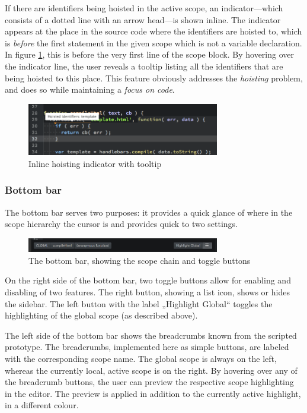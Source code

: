 If there are identifiers being hoisted in the active scope, an
indicator—which consists of a dotted line with an arrow head—is shown
inline. The indicator appears at the place in the source code where the
identifiers are hoisted to, which is \emph{before} the first statement
in the given scope which is not a variable declaration. In figure
\ref{fig:protohoisting}, this is before the very first line of the scope
block. By hovering over the indicator line, the user reveals a tooltip
listing all the identifiers that are being hoisted to this place. This
feature obviously addresses the \emph{hoisting} problem, and does so
while maintaining a \emph{focus on code}.

\begin{figure}[htbp]
\centering
\includegraphics[keepaspectratio,width=0.75\textwidth]{img/hoisting.png}
\caption{Inline hoisting indicator with tooltip}
\label{fig:protohoisting}
\end{figure}

\subsubsection{Bottom bar}\label{bottom-bar}

The bottom bar serves two purposes: it provides a quick glance of where
in the scope hierarchy the cursor is and provides quick to two settings.

\begin{figure}[htbp]
\centering
\includegraphics[keepaspectratio,width=0.75\textwidth]{img/bottombar.png}
\caption{The bottom bar, showing the scope chain and toggle buttons}
\label{fig:bottombar}
\end{figure}

On the right side of the bottom bar, two toggle buttons allow for
enabling and disabling of two features. The right button, showing a list
icon, shows or hides the sidebar. The left button with the label
„Highlight Global“ toggles the highlighting of the global scope (as
described above).

The left side of the bottom bar shows the breadcrumbs known from the
scripted prototype. The breadcrumbs, implemented here as simple buttons,
are labeled with the corresponding scope name. The global scope is
always on the left, whereas the currently local, active scope is on the
right. By hovering over any of the breadcrumb buttons, the user can
preview the respective scope highlighting in the editor. The preview is
applied in addition to the currently active highlight, in a different
colour.

